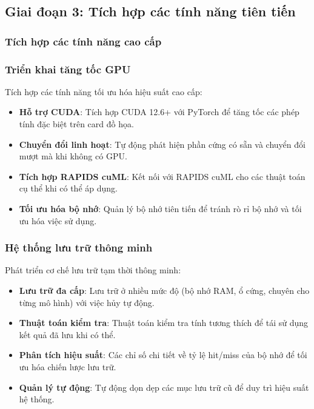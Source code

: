 \subsection{Giai đoạn 3: Tích hợp các tính năng tiên tiến}\label{subsec:advanced-stage}

\subsubsection{Tích hợp các tính năng cao cấp}

\subsubsection{Triển khai tăng tốc GPU}

Tích hợp các tính năng tối ưu hóa hiệu suất cao cấp:

\begin{itemize}
    \item \textbf{Hỗ trợ CUDA}: Tích hợp CUDA 12.6+ với PyTorch để tăng tốc các phép tính đặc biệt trên card đồ họa.
    \item \textbf{Chuyển đổi linh hoạt}: Tự động phát hiện phần cứng có sẵn và chuyển đổi mượt mà khi không có GPU.
    \item \textbf{Tích hợp RAPIDS cuML}: Kết nối với RAPIDS cuML cho các thuật toán cụ thể khi có thể áp dụng.
    \item \textbf{Tối ưu hóa bộ nhớ}: Quản lý bộ nhớ tiên tiến để tránh rò rỉ bộ nhớ và tối ưu hóa việc sử dụng.
\end{itemize}

\subsubsection{Hệ thống lưu trữ thông minh}

Phát triển cơ chế lưu trữ tạm thời thông minh:

\begin{itemize}
    \item \textbf{Lưu trữ đa cấp}: Lưu trữ ở nhiều mức độ (bộ nhớ RAM, ổ cứng, chuyên cho từng mô hình) với việc hủy tự động.
    \item \textbf{Thuật toán kiểm tra}: Thuật toán kiểm tra tính tương thích để tái sử dụng kết quả đã lưu khi có thể.
    \item \textbf{Phân tích hiệu suất}: Các chỉ số chi tiết về tỷ lệ hit/miss của bộ nhớ để tối ưu hóa chiến lược lưu trữ.
    \item \textbf{Quản lý tự động}: Tự động dọn dẹp các mục lưu trữ cũ để duy trì hiệu suất hệ thống.
\end{itemize}

